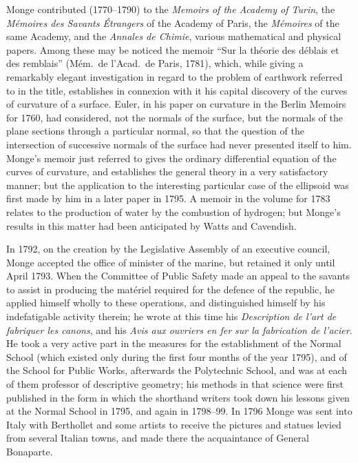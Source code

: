 \documentclass[11pt,a4paper]{article}
\theoremstyle{definition}
\begin{document}
Monge contributed (1770--1790) to the \textit{Memoirs of the Academy of Turin}, the \textit{M\'emoires des Savants \'Etrangers} of the Academy of Paris, the \textit{M\'emoires} of the same Academy, and the \textit{Annales de Chimie}, various mathematical and physical papers. Among these may be noticed the memoir ``Sur la th\'eorie des d\'eblais et des remblais'' (M\'em.\ de l'Acad.\ de Paris, 1781), which, while giving a remarkably elegant investigation in regard to the problem of earthwork referred to in the title, establishes in connexion with it his capital discovery of the curves of curvature of a surface. Euler, in his paper on curvature in the Berlin Memoirs for 1760, had considered, not the normals of the surface, but the normals of the plane sections through a particular normal, so that the question of the intersection of successive normals of the surface had never presented itself to him. Monge's memoir just referred to gives the ordinary differential equation of the curves of curvature, and establishes the general theory in a very satisfactory manner; but the application to the interesting particular case of the ellipsoid was first made by him in a later paper in 1795. A memoir in the volume for 1783 relates to the production of water by the combustion of hydrogen; but Monge's results in this matter had been anticipated by Watts and Cavendish.

In 1792, on the creation by the Legislative Assembly of an executive council, Monge accepted the office of minister of the marine, but retained it only until April 1793. When the Committee of Public Safety made an appeal to the savants to assist in producing the mat\'eriel required for the defence of the republic, he applied himself wholly to these operations, and distinguished himself by his indefatigable activity therein; he wrote at this time his \textit{Description de l'art de fabriquer les canons}, and his \textit{Avis aux ouvriers en fer sur la fabrication de l'acier}. He took a very active part in the measures for the establishment of the Normal School (which existed only during the first four months of the year 1795), and of the School for Public Works, afterwards the Polytechnic School, and was at each of them professor of descriptive geometry; his methods in that science were first published in the form in which the shorthand writers took down his lessons given at the Normal School in 1795, and again in 1798--99. In 1796 Monge was sent into Italy with Berthollet and some artists to receive the pictures and statues levied from several Italian towns, and made there the acquaintance of General Bonaparte.
\end{document}
